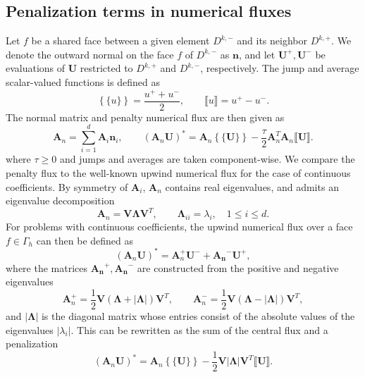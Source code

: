 \documentclass[preprint,10pt]{elsarticle}
\newcommand{\LRp}[1]{\left( #1 \right)}
\newcommand{\LRb}[1]{\left| #1 \right|}
\newcommand{\LRc}[1]{\left\{ #1 \right\}}
\newcommand{\jump}[1] {\ensuremath{\llbracket#1\rrbracket}}
\newcommand{\avg}[1] {\ensuremath{\LRc{\!\{#1\}\!}}}
\newcommand{\Gh}{\Gamma_h}
\begin{document}

\subsection{Penalization terms in numerical fluxes}

Let $f$ be a shared face between a given element $D^{k,-}$ and its neighbor $D^{k,+}$.  We denote the outward normal on the face $f$ of $D^{k,-}$ as $\bm{n}$, and let $\bm{U}^+, \bm{U}^-$ be evaluations of $\bm{U}$ restricted to $D^{k,+}$ and $D^{k,-}$, respectively.  The jump and average scalar-valued functions is defined as
\[
\avg{u} = \frac{{u}^+ + u^-}{2}, \qquad \jump{u} = u^+ - u^-.
\]
The normal matrix and penalty numerical flux are then given as
\[
{\bm{A}}_n = \sum_{i=1}^d {\bm{A}_i\bm{n}_i}, \qquad 
(\bm{A}_n\bm{U})^* = \bm{A}_n\avg{\bm{U}} - \frac{\tau}{2} \bm{A}_n^T \bm{A}_n\jump{\bm{U}}.
\]
where $\tau \geq 0$ and jumps and averages are taken component-wise.  We compare the penalty flux to the well-known upwind numerical flux for the case of continuous coefficients.  By symmetry of $\bm{A}_i$, ${\bm{A}}_n$ contains real eigenvalues, and admits an eigenvalue decomposition
\[
\bm{A}_n = \bm{V}{\bm{\Lambda}}\bm{V}^T, \qquad \bm{\Lambda}_{ii} = \lambda_i, \quad 1 \leq i \leq d.
\]
For problems with continuous coefficients, the upwind numerical flux over a face $f \in \Gh$ can then be defined  as
\[
(\bm{A}_n\bm{U})^* = \bm{A}_n^+\bm{U}^- + \bm{A_n}^- \bm{U}^+,
\]
where the matrices $\bm{A_n}^+,\bm{A_n}^-$ are constructed from the positive and negative eigenvalues 
\[
\bm{A}_n^+ = \frac{1}{2}\bm{V} \LRp{\bm{\Lambda} + \LRb{\bm{\Lambda}}} \bm{V}^T, \qquad \bm{A}_n^- = \frac{1}{2}\bm{V} \LRp{\bm{\Lambda} - \LRb{\bm{\Lambda}}} \bm{V}^T,
\]
and $\LRb{\bm{\Lambda}}$ is the diagonal matrix whose entries consist of the absolute values of the eigenvalues $\LRb{\lambda_i}$.  This can be rewritten as the sum of the central flux and a penalization
\[
(\bm{A}_n\bm{U})^* = \bm{A}_n\avg{\bm{U}} - \frac{1}{2}\bm{V}\LRb{\bm{\Lambda}}\bm{V}^T \jump{\bm{U}}.  
\]
\end{document}
